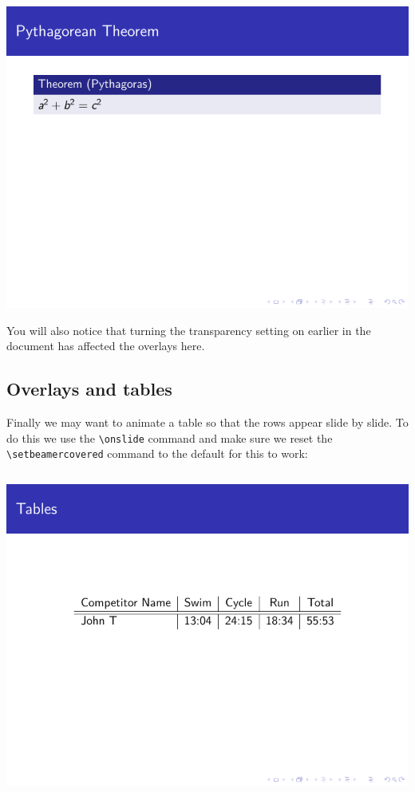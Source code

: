 \begin{column}{0.5\textwidth}
\includegraphics[page=2]{examples/beamer/beameroverlay08.pdf}

You will also notice that turning the transparency setting on earlier in the document has affected the overlays here.

\subsection{Overlays and tables}

Finally we may want to animate a table so that the rows appear slide by slide. To do this we use the \verb|\onslide| command and make sure we reset the \verb|\setbeamercovered| command to the default for this to work:

\inputminted[linenos=true]{latex}{examples/beamer/beameroverlay09.tex}

\includegraphics[page=1]{examples/beamer/beameroverlay09.pdf}


\end{column}
